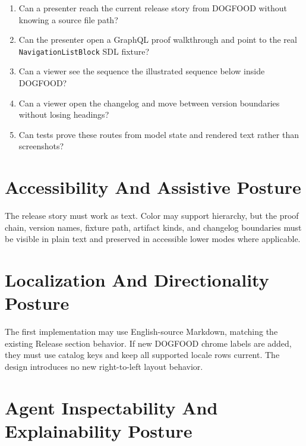 \begin{enumerate}
\def\labelenumi{\arabic{enumi}.}
\tightlist
\item
  Can a presenter reach the current release story from DOGFOOD without knowing a source file path?
\item
  Can the presenter open a GraphQL proof walkthrough and point to the real \texttt{N\allowbreak{}a\allowbreak{}v\allowbreak{}i\allowbreak{}g\allowbreak{}a\allowbreak{}t\allowbreak{}i\allowbreak{}o\allowbreak{}n\allowbreak{}L\allowbreak{}i\allowbreak{}s\allowbreak{}t\allowbreak{}B\allowbreak{}l\allowbreak{}o\allowbreak{}c\allowbreak{}k} SDL fixture?
\item
  Can a viewer see the sequence the illustrated sequence below inside DOGFOOD?
\item
  Can a viewer open the changelog and move between version boundaries without losing headings?
\item
  Can tests prove these routes from model state and rendered text rather than screenshots?
\end{enumerate}



\section{Accessibility And Assistive Posture}\label{record-118-accessibility-and-assistive-posture}

The release story must work as text. Color may support hierarchy, but the proof chain, version names, fixture path, artifact kinds, and changelog boundaries must be visible in plain text and preserved in accessible lower modes where applicable.

\section{Localization And Directionality Posture}\label{record-118-localization-and-directionality-posture}

The first implementation may use English-source Markdown, matching the existing Release section behavior. If new DOGFOOD chrome labels are added, they must use catalog keys and keep all supported locale rows current. The design introduces no new right-to-left layout behavior.

\section{Agent Inspectability And Explainability Posture}\label{record-118-agent-inspectability-and-explainability-posture}

